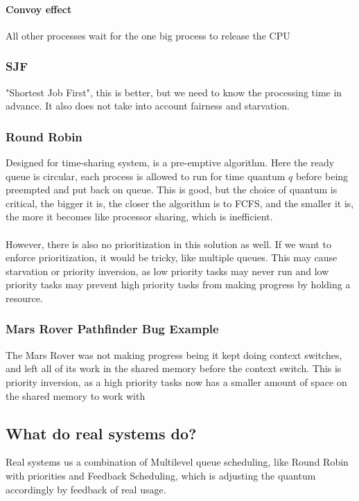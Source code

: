 \documentclass{article}
\begin{document}
\paragraph{Convoy effect} All other processes wait for the one big process to release the CPU


\subsubsection{SJF}

"Shortest Job First", this is better, but we need to know the processing time in advance. It also does not take into account fairness and starvation.

\subsubsection{Round Robin}
Designed for time-sharing system, is a pre-emptive algorithm. Here the ready queue is circular, each process is allowed to run for time quantum $q$ before being preempted and put back on queue. This is good, but the choice of quantum is critical, the bigger it is, the closer the algorithm is to FCFS, and the smaller it is, the more it becomes like processor sharing, which is inefficient.\\
\\
However, there is also no prioritization in this solution as well. If we want to enforce prioritization, it would be tricky, like multiple queues. This may cause starvation or priority inversion, as low priority tasks may never run and low priority tasks may prevent high priority tasks from making progress by holding a resource.

\subsubsection{Mars Rover Pathfinder Bug Example}

The Mars Rover was not making progress being it kept doing context switches, and left all of its work in the shared memory before the context switch. This is priority inversion, as a high priority tasks now has a smaller amount of space on the shared memory to work with

\subsection{What do real systems do?}

Real systems us a combination of Multilevel queue scheduling, like Round Robin with priorities and Feedback Scheduling, which is adjusting the quantum accordingly by feedback of real usage.
\end{document}
